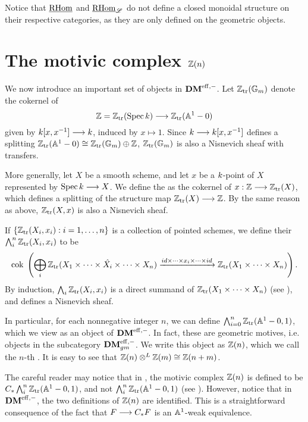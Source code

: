 \begin{rmk}\label{rmk_partial_ihom}
Notice that $\underline{\mathrm{RHom}}$ and $\underline{\mathrm{RHom}}_{\mathscr{L}}$ do not define a closed
monoidal structure on their respective categories, as they are only
defined on the geometric objects.
\end{rmk}

\section{The motivic complex $\mathbb{Z}(n)$}
\label{sect_motivic_complex}

We now introduce an important set of objects in $\mathbf{DM}^{\mathrm{eff},-}$. Let 
$\mathbb{Z}_{\mathrm{tr}}(\mathbb{G}_m)$ denote the cokernel of
\[
   \mathbb{Z} = \mathbb{Z}_{\mathrm{tr}}(\mathrm{Spec}\, k) \longrightarrow \mathbb{Z}_{\mathrm{tr}}(\mathbb{A}^1 - 0)
\]
given by $k [x, x^{-1}] \longrightarrow k$, induced by
$x \mapsto 1$. Since $k \longrightarrow k[x, x^{-1}]$
defines a splitting $\mathbb{Z}_{\mathrm{tr}}(\mathbb{A}^1 - 0) \cong \mathbb{Z}_{\mathrm{tr}}(\mathbb{G}_m) \oplus \mathbb{Z}$,
$\mathbb{Z}_{\mathrm{tr}}(\mathbb{G}_m)$ is also a Nisnevich sheaf with transfers. 

More generally, let $X$ be a smooth scheme, and let $x$ be a 
$k$-point of $X$ represented by $\mathrm{Spec}\, k \longrightarrow X$. We 
define the  as the 
cokernel of $x: \mathbb{Z} \longrightarrow \mathbb{Z}_{\mathrm{tr}}(X)$, which defines a splitting of the 
structure map $\mathbb{Z}_{\mathrm{tr}}(X) \longrightarrow \mathbb{Z}$. By the same reason as above, 
$\mathbb{Z}_{\mathrm{tr}}(X, x)$ is also a Nisnevich sheaf.

If $\{\mathbb{Z}_{\mathrm{tr}}(X_i, x_i) : i = 1,\dots, n\}$ is a collection of 
pointed schemes, we define their  $\bigwedge_i^n
\mathbb{Z}_{\mathrm{tr}}(X_i, x_i)$ to be
\[
\mathrm{cok}\; \left( \bigoplus_i \mathbb{Z}_{\mathrm{tr}}(X_1 \times \cdots \times \hat{X_i} 
   \times \cdots \times X_n) \xrightarrow{id \times \cdots \times 
      x_i \times \cdots \times id} \mathbb{Z}_{\mathrm{tr}}(X_1 \times \cdots \times 
         X_n)\right).
\]
By induction, $\bigwedge_i \mathbb{Z}_{\mathrm{tr}}(X_i, x_i)$ is a direct summand of
$\mathbb{Z}_{\mathrm{tr}}(X_1 \times \cdots \times X_n)$ (see \cite[2.13]{MVW}),
and defines a Nisnevich sheaf.

In particular, for each nonnegative integer $n$, we can define 
$\bigwedge_{i = 0}^n \mathbb{Z}_{\mathrm{tr}}(\mathbb{A}^1 - 0, 1)$, which we view as an 
object of $\mathbf{DM}^{\mathrm{eff},-}$. In fact, these are geometric motives, i.e.
objects in the subcategory $\mathbf{DM}^{\mathrm{eff},-}_{gm}$. We write this object as
$\mathbb{Z}(n)$, which we call the $n$-th . It is 
easy to see that $\mathbb{Z}(n) \otimes^L \mathbb{Z}(m) \cong \mathbb{Z}(n + m)$. 

\begin{rmk}
The careful reader may notice that in \cite{MVW}, the motivic 
complex $\mathbb{Z}(n)$ is defined to be $C_{*} \bigwedge_i^n \mathbb{Z}_{\mathrm{tr}}(\mathbb{A}^1 
- 0, 1)$, and not $\bigwedge_i^n \mathbb{Z}_{\mathrm{tr}}(\mathbb{A}^1 - 0, 1)$ (see 
\cite[3.1]{MVW}). However, notice that in $\mathbf{DM}^{\mathrm{eff},-}$, the
two definitions of $\mathbb{Z}(n)$ are identified. This is a 
straightforward consequence of the fact that $F \longrightarrow C_{*} F$ is
an $\mathbb{A}^1$-weak equivalence.
\end{rmk}

